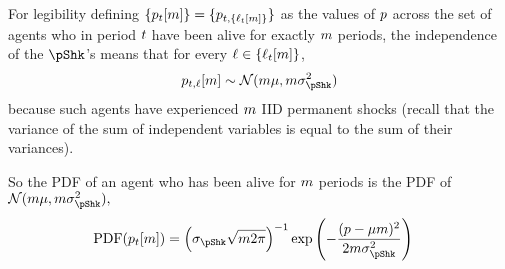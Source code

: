 \documentclass[../BufferStockTheory.tex]{subfiles}\usepackage{ApndxSteadyState}
\begin{document}
  For legibility defining $\{\pLog_{{\tp}\FutPer}[\LooPer]\} = \{\pLog_{{\tp}\FutPer,\{\posn_{{\tp}\FutPer}[\LooPer]\}}\}$ as the values of $\pLog$ across the set of agents who in period ${\tp}\FutPer$ have been alive for exactly $\LooPer$ periods, the independence of the $\pShk$'s means that for every $\posn \in \{\posn_{\FutPer}[\LooPer]\}$,
  \begin{equation}\begin{gathered}\begin{aligned}
    \pLog_{\FutPer,\posn}[\LooPer] \sim \mathcal{N}(\LooPer \pShkMean,\LooPer \sigma^{2}_{\pShk}) \label{eq:dstpnm}
  \end{aligned}\end{gathered}\end{equation}
  because such agents have experienced $\LooPer$ IID permanent shocks (recall that the variance of the sum of independent variables is equal to the sum of their variances).


  \newcommand{\PDF}{\textrm{PDF}}
  So the PDF of an agent who has been alive for $\LooPer$ periods is the PDF of $\mathcal{N}(\LooPer \pShkMean,\LooPer \sigma^{2}_{\pShk}),$
  \begin{equation}\begin{gathered}\begin{aligned}
    \PDF(\pLog_{\FutPer}[\LooPer]) & = \left(
                                     {\sigma_{\pShk}\sqrt{\LooPer 2 \pi}}\right)^{-1} \exp\left(-\frac{(\pLog- \pShkMean \LooPer )^{2}}{2 \LooPer \sigma^{2}_{\pShk}}\right)
  \end{aligned}\end{gathered}\end{equation}
\end{document}
